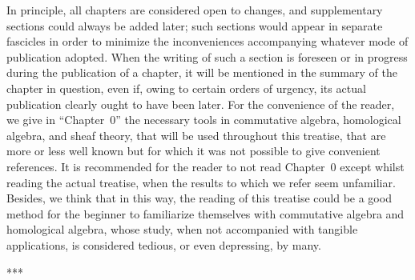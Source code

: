 \documentclass[openany,oneside]{amsbook}
\theoremstyle{ega-env-style}
\theoremstyle{ega-thm-env-style}
\theoremstyle{ega-defn-env-style}
\newcommand{\oldpage}[2][--]{{\marginpar{\textbf{#1}~|~#2}}\ignorespaces}
\def\sectionbreak{\begin{center}***\end{center}}
\begin{document}
\bigskip

In principle, all chapters are considered open to changes, and supplementary sections could always be added later;
such sections would appear in separate fascicles in order to minimize the inconveniences accompanying whatever mode of publication adopted.
When the writing of such a section is foreseen or in progress during the publication of a chapter, it will be mentioned in the summary of the chapter in question, even if, owing to certain orders of urgency, its actual publication clearly ought to have been later.
For the convenience of the reader, we give in ``Chapter~0'' the necessary tools in commutative algebra, homological algebra, and sheaf theory, that will be used throughout this treatise, that are more or less well known but for which it was not possible to give convenient references.
It is recommended for the reader to not read Chapter~0 except whilst reading the actual treatise, when the results to which we refer\oldpage[I]{7} seem unfamiliar.
Besides, we think that in this way, the reading of this treatise could be a good method for the beginner to familiarize themselves with commutative algebra and homological algebra, whose study, when not accompanied with tangible applications, is considered tedious, or even depressing, by many.

\sectionbreak
\end{document}
